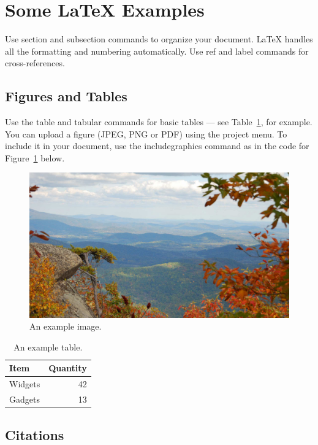 \documentclass[fleqn,10pt,lineno]{wlpeerj} %
\begin{document}
\section*{Some \LaTeX{} Examples}
\label{sec:examples}

Use section and subsection commands to organize your document. \LaTeX{} handles all the formatting and numbering automatically. Use ref and label commands for cross-references.

\subsection*{Figures and Tables}

Use the table and tabular commands for basic tables --- see Table~\ref{tab:widgets}, for example. You can upload a figure (JPEG, PNG or PDF) using the project menu. To include it in your document, use the includegraphics command as in the code for Figure~\ref{fig:view} below.

\begin{figure}[ht]
\centering
\includegraphics[width=\linewidth]{view.jpg}
\caption{An example image.}
\label{fig:view}
\end{figure}

\begin{table}[ht]
\centering
\begin{tabular}{l|r}
Item & Quantity \\\hline
Widgets & 42 \\
Gadgets & 13
\end{tabular}
\caption{\label{tab:widgets}An example table.}
\end{table}

\subsection*{Citations}
\end{document}
